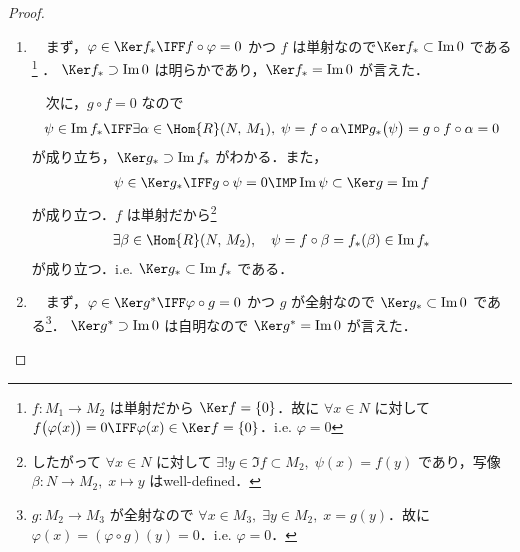 \documentclass[algtopo_main]{subfiles}
\begin{document}
\begin{proof}
    \begin{enumerate}
        \item 　まず，$\varphi \in \Ker f_* \IFF f \circ \varphi = 0$ かつ $f$ は単射なので$\Ker f_* \subset \Im 0$ である\footnote{$f \colon M_1 \to M_2$ は単射だから $\Ker f = \{0\}$．故に $\forall x \in N$ に対して $f \bigl( \varphi(x) \bigr) = 0 \IFF \varphi(x) \in \Ker f = \{0\}$．i.e. $\varphi = 0$} ．
        $\Ker f_* \supset \Im 0$ は明らかであり，$\Ker f_* = \Im 0$ が言えた．
        
        　次に，$g \circ f = 0$ なので 
        \begin{align}
            \psi \in \Im f_* \IFF \exists \alpha \in \Hom{R}(N,\, M_1),\; \psi = f \circ \alpha\IMP g_* \bigl( \psi \bigr) = g \circ f \circ \alpha = 0
        \end{align}
        が成り立ち，$\Ker g_* \supset \Im f_*$ がわかる．また，
        \begin{align}
            \psi \in \Ker g_* \IFF g \circ \psi = 0 \IMP \Im \psi \subset \Ker g = \Im f
        \end{align}
        が成り立つ．$f$ は単射だから\footnote{したがって $\forall x \in N$ に対して $\exists! y \in \Im f \subset M_2,\; \psi(x) = f(y)$ であり，写像 $\beta \colon N \to M_2,\; x \mapsto y$ はwell-defined．}
        \begin{align}
            \exists \beta \in \Hom{R}(N,\, M_2),\quad \psi = f \circ \beta = f_*(\beta) \in \Im f_*
        \end{align}
        が成り立つ．i.e. $\Ker g_* \subset \Im f_*$ である．
        \item 　まず，$\varphi \in \Ker g^* \IFF \varphi \circ g = 0$ かつ $g$ が全射なので $\Ker g_* \subset \Im 0$ である\footnote{$g \colon M_2 \to M_3$ が全射なので $\forall x \in M_3,\; \exists y \in M_2,\; x = g(y)$．故に $\varphi(x) = (\varphi \circ g)(y) = 0$．i.e. $\varphi = 0$．}．
        $\Ker g^* \supset \Im 0$ は自明なので $\Ker g^* = \Im 0$ が言えた．


\end{enumerate}
\end{proof}
\end{document}
